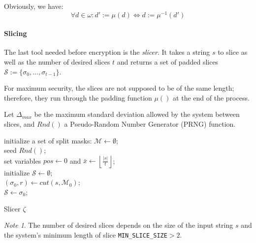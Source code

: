 \documentclass[twoside,twocolumn]{article}
\newcommand{\floor}[1]{\left\lfloor #1 \right\rfloor}
\theoremstyle{definition}
\theoremstyle{remark}
\newtheorem*{remark}{Note}
\begin{document}
Obviously, we have: $$\forall d \in \omega: d' := \mathcal{\mu}(d) \iff d := \mathcal{\mu}^{-1}(d')$$

\paragraph{Slicing}

The last tool needed before encryption is the \emph{slicer}. It takes a string $s$ to slice as well as the number of desired slices $t$ and returns a 
set of padded slices $\mathcal{S} := \{ \sigma_0, \dots, \sigma_{t-1} \}$.

For maximum security, the slices are not supposed to be of the same length; therefore, they run through the padding function $\mu()$ at the end of the 
process.

Let $\Delta_{max}$ be the maximum standard deviation allowed by the system between slices, and $Rnd()$ a Pseudo-Random Number Generator (PRNG) 
function\cite{PRNG}.
\begin{algorithm}
    initialize a set of split masks: $\mathcal{M} \gets \emptyset$; \\
    seed $Rnd()$; \\
    set variables $pos \gets 0$ and $\bar{x} \gets \floor{ \frac{|s|}{t} }$; \\
    initialize $\mathcal{S} \gets \emptyset$; \\
    $(\sigma_0, r) \gets cut(s, \mathcal{M}_0)$; \\
    $\mathcal{S} \gets \sigma_0$; \\
    \caption{Slicer $\zeta$}
    \label{algo:slicer}
\end{algorithm}

\begin{remark}
    The number of desired slices depends on the size of the input string $s$ and the system's minimum length of slice \texttt{MIN\_SLICE\_SIZE}$ > 2$.
\end{remark}
\end{document}
